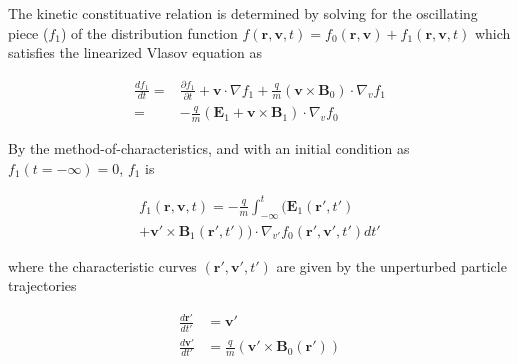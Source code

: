 \documentclass[final,5p,times,twocolumn]{elsarticle}
\newcounter{bla}
\renewcommand{\vec}[1]{\mathbf{#1}}
\begin{document}
The kinetic constituative relation is determined by solving for the oscillating piece ($f_{\mathrm{1}}$) of the distribution function $f\left(\vec{r},\vec{v},t\right)=f_{\mathrm{0}}\left(\vec{r},\vec{v}\right)+f_{\mathrm{1}}\left(\vec{r},\vec{v},t\right)$ which satisfies the linearized Vlasov equation as 
%
\begin{linenomath}
\begin{equation}
\begin{split}
\label{eq:lin_vlasov}
\frac{df_1}{dt}=&\frac{\partial f_1}{\partial t}+\vec{v}\cdot\nabla f_{\mathrm{1}}+\frac{q}{m}\left(\vec{v}\times\vec{B}_{\mathrm{0}}\right)\cdot\nabla_v f_1\\=&-\frac{q}{m}\left(\vec{E}_1+\vec{v}\times\vec{B}_1\right)\cdot\nabla_v f_0
\end{split}
\end{equation}
\end{linenomath}
%
By the method-of-characteristics, and with an initial condition as $f_{\mathrm{1}}\left(t=-\mathrm{\infty}\right)=0$, $f_{\mathrm{1}}$ is 
%
\begin{linenomath}
\begin{equation}
\begin{split}
\label{eq:f1}
f_{\mathrm{1}}\left(\vec{r},\vec{v},t\right)=-\frac{q}{m}\int_{-\mathrm{\infty}}^{t}
\Big(\vec{E}_{\mathrm{1}}\left(\vec{r}',t'\right)\\+\vec{v}' \times\vec{B}_1\left(\vec{r}',t'\right) 
\hspace{0cm}\Big) \cdot\nabla_{v'} f_{\mathrm{0}} \left(\vec{r}',\vec{v}',t'\right)dt'
\end{split}
\end{equation}
\end{linenomath}
%
where the characteristic curves $\left(\vec{r}',\vec{v}',t'\right)$ are given by the unperturbed particle trajectories
%
\begin{linenomath}
\begin{equation}
\begin{split}
\label{eq:trajectories}
\frac{d\vec{r}'}{dt'}&=\vec{v}'\\
\frac{d\vec{v}'}{dt'}&=\frac{q}{m}\left(\vec{v}'\times\vec{B}_{\mathrm{0}}\left(\vec{r}'\right)\right)
\end{split}
\end{equation}
\end{linenomath}
\end{document}
